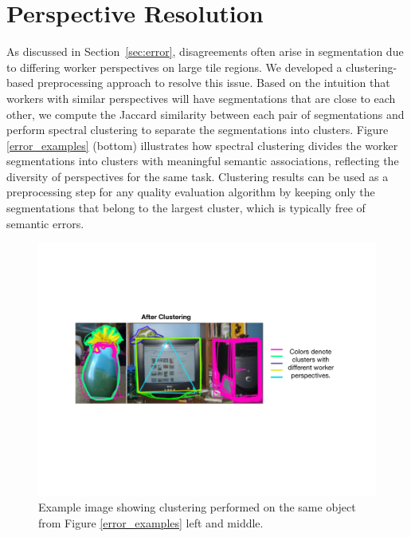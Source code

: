 \documentclass[letterpaper]{article}
\begin{document}
\section{Perspective Resolution\label{perspective}}
As discussed in Section~\ref{sec:error}, disagreements often arise in segmentation due to differing worker perspectives on large tile regions. We developed a clustering-based preprocessing approach to resolve this issue.
Based on the intuition that workers with similar perspectives will have segmentations that are close to each other, we compute the Jaccard similarity between each pair of segmentations and perform spectral clustering to separate the segmentations into clusters. Figure \ref{error_examples} (bottom) illustrates how spectral clustering divides the worker segmentations into clusters with meaningful semantic associations, reflecting the diversity of perspectives for the same task. Clustering results can be used as a preprocessing step for any quality evaluation algorithm by keeping only the segmentations that belong to the largest cluster, which is typically free of semantic errors.
\begin{figure}[h!]
  \centering
  \includegraphics[width=\linewidth]{plots/clustering.pdf}
  \caption{Example image showing clustering performed on the same object from Figure \ref{error_examples} left and middle.}
  \label{cluster_example}
\end{figure}
\end{document}
